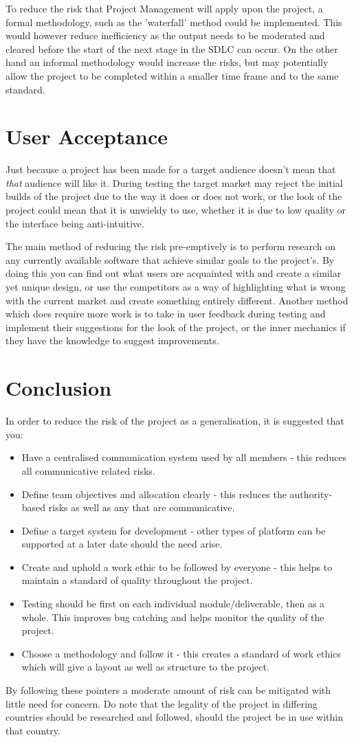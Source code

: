To reduce the risk that Project Management will apply upon the project, a formal
methodology, such as the 'waterfall' method could be implemented. This would
however reduce inefficiency as the output needs to be moderated and cleared
before the start of the next stage in the SDLC can occur. On the other hand an
informal methodology would increase the risks, but may potentially allow the
project to be completed within a smaller time frame and to the same standard.

\section{User Acceptance}
Just because a project has been made for a target audience doesn't mean that
\textit{that} audience will like it. During testing the target market may
reject the initial builds of the project due to the way it does or does not work,
or the look of the project could mean that it is unwieldy to use, whether it is
due to low quality or the interface being anti-intuitive.

The main method of reducing the risk pre-emptively is to perform research on any
currently available software that achieve similar goals to the project's. By
doing this you can find out what users are acquainted with and create a similar
yet unique design, or use the competitors as a way of highlighting what is wrong
with the current market and create something entirely different. Another method
which does require more work is to take in user feedback during testing and
implement their suggestions for the look of the project, or the inner mechanics
if they have the knowledge to suggest improvements.

\section{Conclusion}
In order to reduce the risk of the project as a generalisation, it is suggested
that you:

\begin{itemize}
    \item Have a centralised communication system used by all members - this
          reduces all communicative related risks.
    \item Define team objectives and allocation clearly - this reduces the
          authority-based risks as well as any that are communicative.
    \item Define a target system for development - other types of platform can
          be supported at a later date should the need arise.
    \item Create and uphold a work ethic to be followed by everyone - this helps
          to maintain a standard of quality throughout the project.
    \item Testing should be first on each individual module/deliverable, then as
          a whole. This improves bug catching and helps monitor the quality of
          the project.
    \item Choose a methodology and follow it - this creates a standard of work
          ethics which will give a layout as well as structure to the project.
\end{itemize}

By following these pointers a moderate amount of risk can be mitigated with
little need for concern. Do note that the legality of the project in differing
countries should be researched and followed, should the project be in use within
that country.